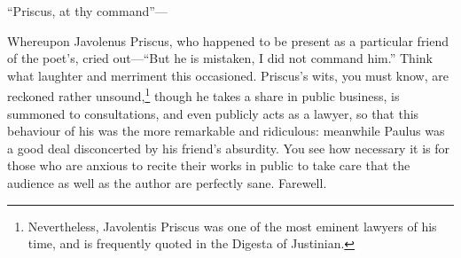 ``Priscus, at thy command''—

Whereupon Javolenus Priscus, who happened to be present as a particular
friend of the poet's, cried out—``But he is mistaken, I did not
command him.'' Think what laughter and merriment this occasioned. Priscus's
wits, you must know, are reckoned rather unsound,\footnote{Nevertheless, Javolentis
Priscus was one of the most eminent lawyers of his time, and is frequently
quoted in the Digesta of Justinian.} though he takes a share
in public business, is summoned to consultations, and even publicly acts
as a lawyer, so that this behaviour of his was the more remarkable and
ridiculous: meanwhile Paulus was a good deal disconcerted by his friend's
absurdity. You see how necessary it is for those who are anxious to recite
their works in public to take care that the audience as well as the author
are perfectly sane. Farewell.


